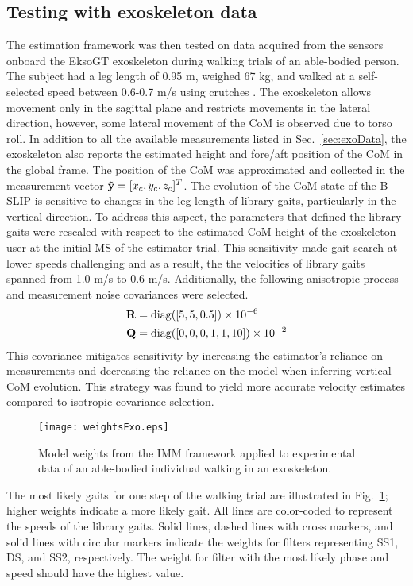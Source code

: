 \subsection{Testing with exoskeleton data}\label{sec:IMM_human}

The estimation framework was then tested on data acquired from the sensors onboard the EksoGT exoskeleton during walking trials of an able-bodied person. The subject had a leg length of 0.95 m, weighed 67 kg, and walked at a self-selected speed between 0.6-0.7 m/s using crutches \cite{gambon2019characterizing}. The exoskeleton allows movement only in the sagittal plane and restricts movements in the lateral direction, however, some lateral movement of the CoM is observed due to torso roll. In addition to all the available measurements listed in Sec.~\ref{sec:exoData}, the exoskeleton also reports the estimated height and fore/aft position of the CoM in the global frame. The position of the CoM was approximated and collected in the measurement vector $ \tilde{\mathbf{y}} = [x_c ,y_c ,z_c]^T $. The evolution of the CoM state of the B-SLIP is sensitive to changes in the leg length of library gaits, particularly in the vertical direction. To address this aspect, the parameters that defined the library gaits were rescaled with respect to the estimated CoM height of the exoskeleton user at the initial MS of the estimator trial. This sensitivity made gait search at lower speeds challenging and as a result, the the velocities of library gaits spanned from 1.0 m/s to 0.6 m/s. Additionally, the following anisotropic process and measurement noise covariances were selected.
\begin{align}
		\mathbf{R} &= {\rm diag}([5,5,0.5])\times 10^{-6} \\
		\mathbf{Q} &={\rm diag}([0,0,0,1,1,10])\times 10^{-2}
\end{align}
This covariance mitigates sensitivity by increasing the estimator's reliance on measurements and decreasing the reliance on the model when inferring vertical CoM evolution. This strategy was found to yield more accurate velocity estimates compared to isotropic covariance selection. 

\begin{figure}
	\centering
	\texttt{[image: weightsExo.eps]}
	\caption{Model weights from the IMM framework applied to experimental data of an able-bodied individual walking in an exoskeleton.}\label{fig:exoWeights}
\end{figure}

The most likely gaits for one step of the walking trial are illustrated in Fig.~\ref{fig:exoWeights}; higher weights indicate a more likely gait. All lines are color-coded to represent the speeds of the library gaits. Solid lines, dashed lines with cross markers, and solid lines with circular markers indicate the weights for filters representing SS1, DS, and SS2, respectively. The weight for filter with the most likely phase and speed should have the highest value. 

